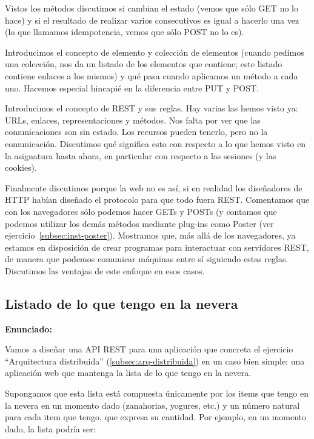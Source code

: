 Vistos los métodos discutimos si cambian el estado (vemos que sólo GET no lo hace) y si el resultado de realizar varios consecutivos es igual a hacerlo una vez (lo que llamamos idempotencia, vemos que sólo POST no lo es).

Introducimos el concepto de elemento y colección de elementos (cuando pedimos una colección, nos da un listado de los elementos que contiene; este listado contiene enlaces a los mismos) y qué pasa cuando aplicamos un método a cada uno. Hacemos especial hincapié en la diferencia entre PUT y POST.

Introducimos el concepto de REST y sus reglas. Hay varias las hemos visto ya: URLs, enlaces, representaciones y métodos. Nos falta por ver que las comunicaciones son sin estado. Los recursos pueden tenerlo, pero no la comunicación. Discutimos qué significa esto con respecto a lo que hemos visto en la asignatura hasta ahora, en particular con respecto a las sesiones (y las cookies).

Finalmente discutimos porque la web no es así, si en realidad los diseñadores de HTTP habían diseñado el protocolo para que todo fuera REST. Comentamos que con los navegadores sólo podemos hacer GETs y POSTs (y contamos que podemos utilizar los demás métodos mediante plug-ins como Poster (ver ejercicio~\ref{subsec:inst-poster}). Mostramos que, más allá de los navegadores, ya estamos en disposición de crear programas para interactuar con servidores REST, de manera que podemos comunicar máquinas entre sí siguiendo estas reglas. Discutimos las ventajas de este enfoque en esos casos.

\subsection{Listado de lo que tengo en la nevera}
\label{subsec:contenido-nevera}

\textbf{Enunciado:}

Vamos a diseñar una API REST para una aplicación que concreta el ejercicio ``Arquitectura distribuida'' (\ref{subsec:arq-distribuida}) en un caso bien simple: una aplicación web que mantenga la lista de lo que tengo en la nevera.

Supongamos que esta lista está compuesta únicamente por los items que tengo en la nevera en un momento dado (zanahorias, yogures, etc.) y un número natural para cada item que tengo, que expresa su cantidad. Por ejemplo, en un momento dado, la lista podría ser:

